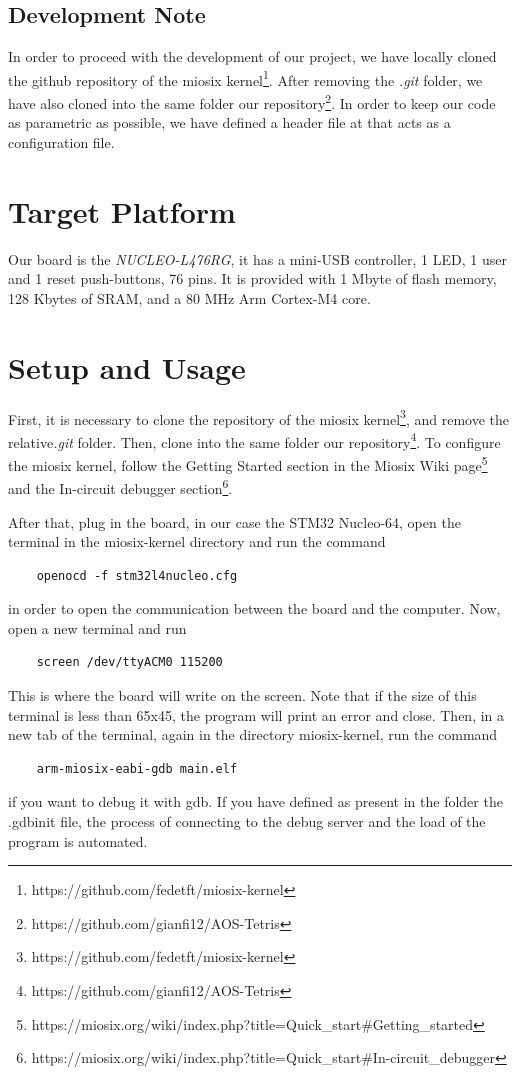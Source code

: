 \documentclass{article}
\begin{document}
\subsection{Development Note}
In order to proceed with the development of our project, we have locally cloned the github repository of the miosix kernel\footnote{https://github.com/fedetft/miosix-kernel}.
After removing the \emph{.git} folder, we have also cloned into the same folder our repository\footnote{https://github.com/gianfi12/AOS-Tetris}.
In order to keep our code as parametric as possible, we have defined a header file at  that acts as a configuration file.

\section{Target Platform}
Our board is the \emph{NUCLEO-L476RG}, it has a mini-USB controller, 1 LED, 1 user and 1 reset push-buttons, 76 pins.
It is provided with 1 Mbyte of flash memory, 128 Kbytes of SRAM, and a 80 MHz Arm Cortex-M4 core.

\section{Setup and Usage}
First, it is necessary to clone the repository of the miosix kernel\footnote{https://github.com/fedetft/miosix-kernel}, and remove the relative\emph{.git} folder.\newline
Then, clone into the same folder our repository\footnote{https://github.com/gianfi12/AOS-Tetris}.\newline
To configure the miosix kernel, follow the Getting Started section in the Miosix Wiki page\footnote{https://miosix.org/wiki/index.php?title=Quick\_start\#Getting\_started} 
and the In-circuit debugger section\footnote{https://miosix.org/wiki/index.php?title=Quick\_start\#In-circuit\_debugger}.\newline

After that, plug in the board, in our case the STM32 Nucleo-64, open the terminal in the miosix-kernel directory and run the command
\begin{verbatim}
    openocd -f stm32l4nucleo.cfg
\end{verbatim}
in order to open the communication between the board and the computer.\newline
Now, open a new terminal and run
\begin{verbatim}
    screen /dev/ttyACM0 115200
\end{verbatim}
This is where the board will write on the screen. Note that if the size of this terminal is less than 65x45, the program will print an error and close.
Then, in a new tab of the terminal, again in the directory miosix-kernel, run the command
\begin{verbatim}
    arm-miosix-eabi-gdb main.elf
\end{verbatim}
if you want to debug it with gdb. If you have defined as present in the folder the .gdbinit file, the process of connecting to the debug server and the load of the program is automated.
\end{document}
